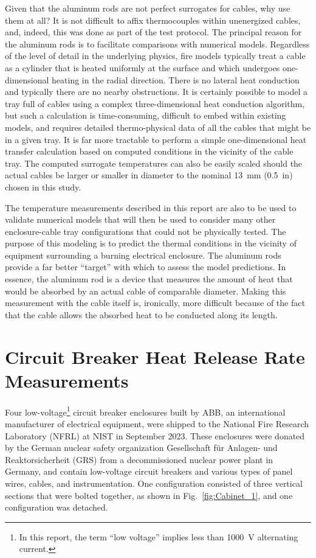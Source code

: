Given that the aluminum rods are not perfect surrogates for cables, why use them at all? It is not difficult to affix thermocouples within unenergized cables, and, indeed, this was done as part of the test protocol. The principal reason for the aluminum rods is to facilitate comparisons with numerical models. Regardless of the level of detail in the underlying physics, fire models typically treat a cable as a cylinder that is heated uniformly at the surface and which undergoes one-dimensional heating in the radial direction. There is no lateral heat conduction and typically there are no nearby obstructions. It is certainly possible to model a tray full of cables using a complex three-dimensional heat conduction algorithm, but such a calculation is time-consuming, difficult to embed within existing models, and requires detailed thermo-physical data of all the cables that might be in a given tray. It is far more tractable to perform a simple one-dimensional heat transfer calculation based on computed conditions in the vicinity of the cable tray. The computed surrogate temperatures can also be easily scaled should the actual cables be larger or smaller in diameter to the nominal 13~mm (0.5~in) chosen in this study.

The temperature measurements described in this report are also to be used to validate numerical models that will then be used to consider many other enclosure-cable tray configurations that could not be physically tested. The purpose of this modeling is to predict the thermal conditions in the vicinity of equipment surrounding a burning electrical enclosure. The aluminum rods provide a far better ``target'' with which to assess the model predictions. In essence, the aluminum rod is a device that measures the amount of heat that would be absorbed by an actual cable of comparable diameter. Making this measurement with the cable itself is, ironically, more difficult because of the fact that the cable allows the absorbed heat to be conducted along its length.

\newpage

\section{Circuit Breaker Heat Release Rate Measurements}
\label{Sec:Circuit Breakers}

Four low-voltage\footnote{In this report, the term ``low voltage'' implies less than 1000~V alternating current.} circuit breaker enclosures built by ABB, an international manufacturer of electrical equipment, were shipped to the National Fire Research Laboratory (NFRL) at NIST in September 2023. These enclosures were donated by the German nuclear safety organization Gesellschaft für Anlagen- und Reaktorsicherheit (GRS) from a decommissioned nuclear power plant in Germany, and contain low-voltage circuit breakers and various types of panel wires, cables, and instrumentation. One configuration consisted of three vertical sections that were bolted together, as shown in Fig.~\ref{fig:Cabinet_1}, and one configuration was detached.

